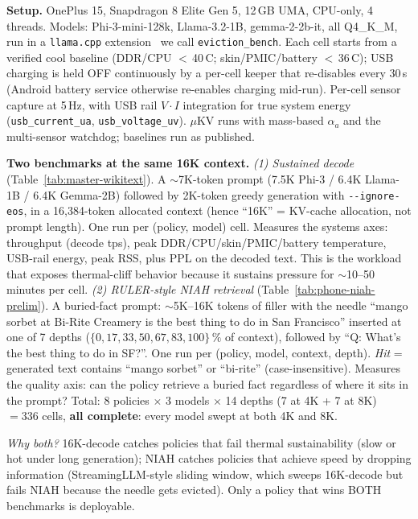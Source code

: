 \documentclass[sigconf, anonymous=false, screen=true]{acmart}
\newcommand{\ub}{\_\allowbreak}
\begin{document}
\textbf{Setup.} OnePlus 15, Snapdragon 8 Elite Gen 5, 12\,GB UMA, CPU-only, 4 threads. Models: Phi-3-mini-128k, Llama-3.2-1B, gemma-2-2b-it, all Q4\_K\_M, run in a \texttt{llama.cpp} extension~\cite{llamacpp} we call \texttt{eviction\ub bench}. Each cell starts from a verified cool baseline (DDR/CPU $<$\,40\,\textdegree C; skin/PMIC/battery $<$\,36\,\textdegree C); USB charging is held OFF continuously by a per-cell keeper that re-disables every 30\,s (Android battery service otherwise re-enables charging mid-run). Per-cell sensor capture at 5\,Hz, with USB rail $V{\cdot}I$ integration for true system energy (\texttt{usb\_current\_ua}, \texttt{usb\_voltage\_uv}). $\mu$KV runs with mass-based $\alpha_a$ and the multi-sensor watchdog; baselines run as published.

\textbf{Two benchmarks at the same 16K context.}
\emph{(1) Sustained decode} (Table~\ref{tab:master-wikitext}). A $\sim$7K-token prompt (7.5K Phi-3 / 6.4K Llama-1B / 6.4K Gemma-2B) followed by 2K-token greedy generation with \texttt{-{}-ignore\allowbreak-eos}, in a 16{,}384-token allocated context (hence ``16K'' = KV-cache allocation, not prompt length). One run per (policy, model) cell. Measures the systems axes: throughput (decode tps), peak DDR/CPU/skin/PMIC/battery temperature, USB-rail energy, peak RSS, plus PPL on the decoded text. This is the workload that exposes thermal-cliff behavior because it sustains pressure for $\sim$10--50 minutes per cell.
\emph{(2) RULER-style NIAH retrieval} (Table~\ref{tab:phone-niah-prelim}). A buried-fact prompt: $\sim$5K--16K tokens of filler with the needle ``mango sorbet at Bi-Rite Creamery is the best thing to do in San Francisco'' inserted at one of 7 depths ($\{0, 17, 33, 50, 67, 83, 100\}\,\%$ of context), followed by ``Q: What's the best thing to do in SF?''. One run per (policy, model, context, depth). \emph{Hit} = generated text contains ``mango sorbet'' or ``bi-rite'' (case-insensitive). Measures the quality axis: can the policy retrieve a buried fact regardless of where it sits in the prompt? Total: 8 policies $\times$ 3 models $\times$ 14 depths (7 at 4K + 7 at 8K) $= 336$ cells, \textbf{all complete}: every model swept at both 4K and 8K.

\emph{Why both?} 16K-decode catches policies that fail thermal sustainability (slow or hot under long generation); NIAH catches policies that achieve speed by dropping information (StreamingLLM-style sliding window, which sweeps 16K-decode but fails NIAH because the needle gets evicted). Only a policy that wins BOTH benchmarks is deployable.
\end{document}
